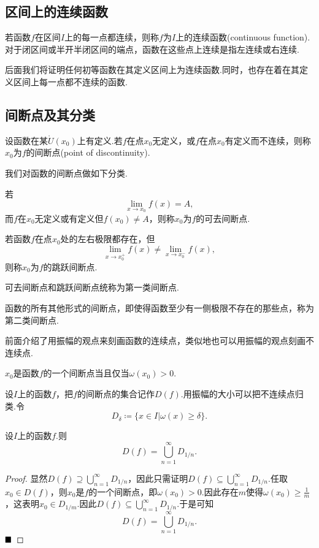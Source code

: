 \subsection{区间上的连续函数}
\begin{definition}
	若函数$f$在区间$I$上的每一点都连续，则称$f$为$I$上的{\heiti 连续函数}(continuous function).对于闭区间或半开半闭区间的端点，函数在这些点上连续是指左连续或右连续.
\end{definition}
后面我们将证明任何初等函数在其定义区间上为连续函数.同时，也存在着在其定义区间上每一点都不连续的函数.
\subsection{间断点及其分类}
\begin{definition}[间断点]
	设函数在某$\mathring{U}(x_0)$上有定义.若$f$在点$x_0$无定义，或$f$在点$x_0$有定义而不连续，则称$x_0$为$f$的{\heiti 间断点}(point of discontinuity).
\end{definition}
我们对函数的间断点做如下分类.
\begin{definition}[可去间断点]
	若
	$$\lim\limits_{x\to x_0}f(x)=A,$$
	而$f$在$x_0$无定义或有定义但$f(x_0)\neq A$，则称$x_0$为$f$的可去间断点.
\end{definition}
\begin{definition}[跳跃间断点]
	若函数$f$在点$x_0$处的左右极限都存在，但
	$$\lim\limits_{x\to x_0^+}f(x)\neq \lim\limits_{x\to x_0^-}f(x),$$
	则称$x_0$为$f$的跳跃间断点.
\end{definition}
可去间断点和跳跃间断点统称为{\heiti 第一类间断点}.

函数的所有其他形式的间断点，即使得函数至少有一侧极限不存在的那些点，称为{\heiti 第二类间断点}.

前面介绍了用振幅的观点来刻画函数的连续点，类似地也可以用振幅的观点刻画不连续点.
\begin{theorem}
	$x_0$是函数$f$的一个间断点当且仅当$\omega(x_0)>0$.
\end{theorem}
设$I$上的函数$f$，把$f$的间断点的集合记作$D(f)$.用振幅的大小可以把不连续点归类.令
$$D_\delta\coloneqq\{x\in I|\omega(x)\geqslant\delta\}.$$
\begin{proposition}\label{prop:jianduan}
	设$I$上的函数$f$.则
	$$D(f)=\bigcup_{n=1}^\infty D_{1/n}.$$
\end{proposition}
\begin{proof}
	显然$D(f)\supseteq\displaystyle\bigcup_{n=1}^{\infty}D_{1/n}$，因此只需证明$D(f)\subseteq\displaystyle\bigcup_{n=1}^{\infty}D_{1/n}$.任取$x_0\in D(f)$，则$x_0$是$f$的一个间断点，即$\omega(x_0)>0$.因此存在$m$使得$\omega(x_0)\geqslant\frac{1}{m}$，这表明$x_0\in D_{1/m}$.因此$D(f)\subseteq\displaystyle\bigcup_{n=1}^{\infty}D_{1/n}$.于是可知
	$$D(f)=\bigcup_{n=1}^{\infty}D_{1/n}.$$
	$\hfill\blacksquare$
\end{proof}
